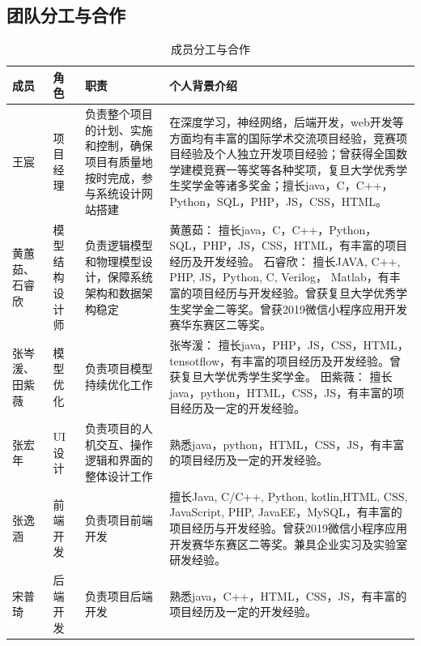 \documentclass[hyperref, a4paper]{ctexart}
\begin{document}
\hypertarget{ux56e2ux961fux5206ux5de5ux4e0eux5408ux4f5c}{%
\subsection{团队分工与合作}\label{ux56e2ux961fux5206ux5de5ux4e0eux5408ux4f5c}}

\begin{table}[H]
\small 
\begin{center}  
\begin{tabular}{|p{1.5cm}|p{3cm}|p{5cm}||p{5cm}|}  
\hline 
成员 & 角色 & 职责 & 个人背景介绍    \\ \hline  
王宸 & 项目经理 & 负责整个项目的计划、实施和控制，确保项目有质量地按时完成，参与系统设计网站搭建 
& 在深度学习，神经网络，后端开发，web开发等方面均有丰富的国际学术交流项目经验，竞赛项目经验及个人独立开发项目经验；曾获得全国数学建模竞赛一等奖等各种奖项，复旦大学优秀学生奖学金等诸多奖金；擅长java，C，C++，Python，SQL，PHP，JS，CSS，HTML。    \\ \hline
黄蕙茹、石睿欣  & 模型结构设计师&负责逻辑模型和物理模型设计，保障系统架构和数据架构稳定 &黄蕙茹：
擅长java，C，C++，Python，SQL，PHP，JS，CSS，HTML，有丰富的项目经历及开发经验。
石睿欣： 擅长JAVA, C++, PHP, JS，Python, C, Verilog， Matlab，有丰富的项目经历与开发经验。曾获复旦大学优秀学生奖学金二等奖。曾获2019微信小程序应用开发赛华东赛区二等奖。    \\ \hline
张岑湲、田紫薇& 模型优化 & 负责项目模型持续优化工作 & 张岑湲：
擅长java，PHP，JS，CSS，HTML，tensotflow，有丰富的项目经历及开发经验。曾获复旦大学优秀学生奖学金。 田紫薇：
擅长java，python，HTML，CSS，JS，有丰富的项目经历及一定的开发经验。\\ \hline
张宏年 & UI设计 & 负责项目的人机交互、操作逻辑和界面的整体设计工作 & 
熟悉java，python，HTML，CSS，JS，有丰富的项目经历及一定的开发经验。\\ \hline
张逸涵 & 前端开发 & 负责项目前端开发 & 擅长Java, C/C++, Python, kotlin,HTML, CSS, JavaScript, PHP, JavaEE，MySQL，有丰富的项目经历与开发经验。曾获2019微信小程序应用开发赛华东赛区二等奖。兼具企业实习及实验室研发经验。 \\ \hline
宋普琦 & 后端开发 & 负责项目后端开发 & 熟悉java，C++，HTML，CSS，JS，有丰富的项目经历及一定的开发经验。 \\ \hline


\end{tabular}  
\caption{成员分工与合作} 
\end{center}  
\end{table}
\end{document}
